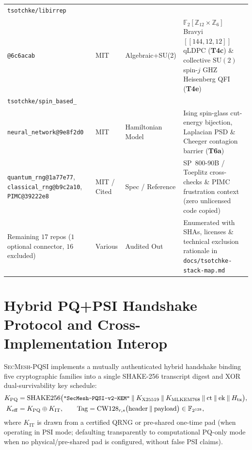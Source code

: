 \documentclass[11pt,reqno]{amsart}
\newcommand{\F}{\mathbb{F}}
\newcommand{\Z}{\mathbb{Z}}
\newcommand{\code}[1]{\texttt{\small #1}}
\begin{document}
\begin{table}[t]
\begin{tabularx}{\linewidth}{@{} >{\RaggedRight\arraybackslash}p{4.0cm} l l Y @{}}
\texttt{tsotchke/libirrep}\\\texttt{@6c6acab} & MIT & Algebraic+SU(2) & $\F_2[\Z_{12}\times\Z_6]$ Bravyi $[[144,12,12]]$ qLDPC (\textbf{T4c}) \& collective $\mathrm{SU}(2)$ spin-$j$ GHZ Heisenberg QFI (\textbf{T4e})~\cite{tsotchke_libirrep} \\
\texttt{tsotchke/spin\_based\_}\\\texttt{neural\_network@9e8f2d0} & MIT & Hamiltonian Model & Ising spin-glass cut-energy bijection, Laplacian PSD \& Cheeger contagion barrier (\textbf{T6a})~\cite{tsotchke_sbnn} \\
\texttt{quantum\_rng@1a77e77}, \texttt{classical\_rng@b9c2a10}, \texttt{PIMC@39222e8} & MIT / Cited & Spec / Reference & SP~800-90B / Toeplitz cross-checks \& PIMC frustration context (zero unlicensed code copied) \\
Remaining $17$ repos ($1$ optional connector, $16$ excluded) & Various & Audited Out & Enumerated with SHAs, licenses \& technical exclusion rationale in \texttt{docs/tsotchke-stack-map.md} \\
\bottomrule
\end{tabularx}
\end{table}

\section{Hybrid PQ+PSI Handshake Protocol and Cross-Implementation Interop}
\label{sec:protocol}

\textsc{SecMesh-PQSI} implements a mutually authenticated hybrid handshake binding five cryptographic families into a single SHAKE-256 transcript digest and XOR dual-survivability key schedule:
\begin{align*}
  K_{\mathrm{PQ}} &= \mathrm{SHAKE256}\bigl(\text{\code{"SecMesh-PQSI-v2-KEM"}} \mathbin{\Vert} K_{\mathrm{X25519}} \mathbin{\Vert} K_{\mathrm{MLKEM768}} \mathbin{\Vert} \mathrm{ct} \mathbin{\Vert} \mathrm{ek} \mathbin{\Vert} H_{\mathrm{tx}}\bigr), \\
  K_{\mathrm{eff}} &= K_{\mathrm{PQ}} \oplus K_{\mathrm{IT}}, \qquad
  \mathrm{Tag} = \mathrm{CW128}_{r, s}\bigl(\mathrm{header} \mathbin{\Vert} \mathrm{payload}\bigr) \in \F_{2^{128}},
\end{align*}
where $K_{\mathrm{IT}}$ is drawn from a certified QRNG or pre-shared one-time pad (when operating in PSI mode; defaulting transparently to computational PQ-only mode when no physical/pre-shared pad is configured, without false PSI claims).
\end{document}
